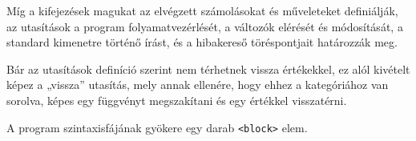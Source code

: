 Míg a kifejezések magukat az elvégzett számolásokat és műveleteket definiálják, az utasítások a program folyamatvezérlését, a változók elérését és módosítását, a standard kimenetre történő írást, és a hibakereső töréspontjait határozzák meg.

Bár az utasítások definíció szerint nem térhetnek vissza értékekkel, ez alól kivételt képez a „vissza” utasítás, mely annak ellenére, hogy ehhez a kategóriához van sorolva, képes egy függvényt megszakítani és egy értékkel visszatérni.

A program szintaxisfájának gyökere egy darab \texttt{<block>} elem.